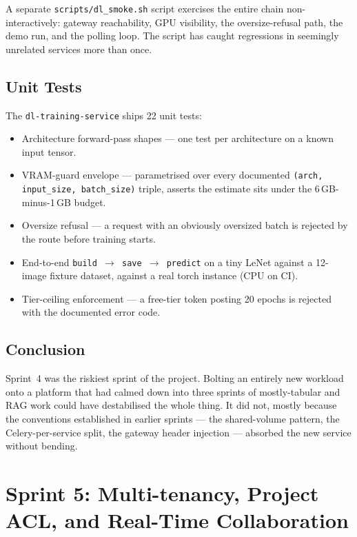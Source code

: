 \documentclass[12pt, a4paper, oneside]{report}
\begin{document}
A separate \texttt{scripts/dl\_smoke.sh} script exercises the entire
chain non-interactively: gateway reachability, GPU visibility, the
oversize-refusal path, the demo run, and the polling loop. The
script has caught regressions in seemingly unrelated services more
than once.

\section{Unit Tests}

The \texttt{dl-training-service} ships 22 unit tests:

\begin{itemize}
    \item Architecture forward-pass shapes --- one test per
        architecture on a known input tensor.
    \item VRAM-guard envelope --- parametrised over every
        documented \texttt{(arch, input\_size, batch\_size)}
        triple, asserts the estimate sits under the
        6\,GB-minus-1\,GB budget.
    \item Oversize refusal --- a request with an obviously oversized
        batch is rejected by the route before training starts.
    \item End-to-end \texttt{build $\to$ save $\to$ predict} on
        a tiny LeNet against a 12-image fixture dataset, against
        a real torch instance (CPU on CI).
    \item Tier-ceiling enforcement --- a free-tier token posting
        20 epochs is rejected with the documented error code.
\end{itemize}

\section*{Conclusion}

Sprint~4 was the riskiest sprint of the project. Bolting an entirely
new workload onto a platform that had calmed down into three sprints
of mostly-tabular and RAG work could have destabilised the whole
thing. It did not, mostly because the conventions established in
earlier sprints --- the shared-volume pattern, the Celery-per-service
split, the gateway header injection --- absorbed the new service
without bending.

\chapter{Sprint 5: Multi-tenancy, Project ACL, and Real-Time Collaboration}
\end{document}
